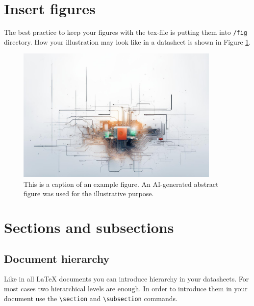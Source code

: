 \documentclass[a4paper, 10pt, onecolumn]{article}
\begin{document}
\section*{Insert figures}
The best practice to keep your figures with the tex-file is putting them into \verb+/fig+ directory. 
How your illustration may look like in a datasheet is shown in Figure \ref{fig:FigureRef}.
\begin{figure}[H]
    \centering %
    \includegraphics[width=10cm]{fig/SampleFigure.png}
    \caption{This is a caption of an example figure. An AI-generated abstract figure was used for the illustrative purpose.}
    \label{fig:FigureRef}
\end{figure}

\section*{Sections and subsections}

\subsection*{Document hierarchy}
Like in all LaTeX documents you can introduce hierarchy in your datasheets. 
For most cases two hierarchical levels are enough. 
In order to introduce them in your document use the \verb+\section+ and \verb+\subsection+ commands. 
\end{document}
